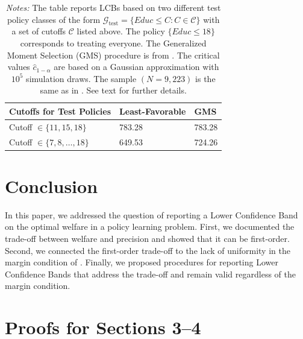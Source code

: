 \documentclass[12pt]{article}
\numberwithin{equation}{section}
\theoremstyle{plain}                         %
\theoremstyle{definition}                  %
\theoremstyle{remark}                      %
\begin{document}
\begin{table}
 \label{tab:momineq}
\centering 
\begin{tabularx}{\textwidth}{@{}YYY@{}}
    \toprule
   Cutoffs for Test Policies  &  Least-Favorable &  GMS   \\
    \midrule  
 Cutoff $\in \{11, 15, 18\}$ &  783.28 &   783.28 \\[4mm]
Cutoff $\in \{7, 8, \dots,  18\}$ &   649.53 &  724.26 \\
    \bottomrule
\end{tabularx}

\caption*{
\textit{Notes:} The table reports LCBs based on two different test policy classes of the form $\mathcal{G}_{\text{test}} = \{ Educ \leq  C: C \in \mathcal{C}\}$ with a set of cutoffs $\mathcal{C}$ listed above. The policy $\{Educ \leq 18\}$ corresponds to treating everyone. The Generalized Moment Selection (GMS) procedure is from \citet{andrews2010inference}. The critical values $\widehat {c}_{1-\alpha}$ are based on a Gaussian approximation with $10^5$ simulation draws. The sample  $(N=9,223)$ is the same as in \citet{KitagawaTetenov}. See text for further details. }

\end{table}



\section{Conclusion}
\label{sec:concl}
In this paper, we addressed the question of reporting a Lower Confidence Band on the optimal welfare in a policy learning problem. First, we documented the trade-off between welfare and precision and showed that it can be first-order. Second, we connected the first-order trade-off to the lack of uniformity in the margin condition of \citet{MammenTsybakov, Tsybakov}. Finally, we proposed procedures for reporting Lower Confidence Bands that address the trade-off and remain valid regardless of the margin condition. 








\newpage 

\appendix

\section{Proofs for Sections 3--4} \label{app:proofs}
\end{document}
